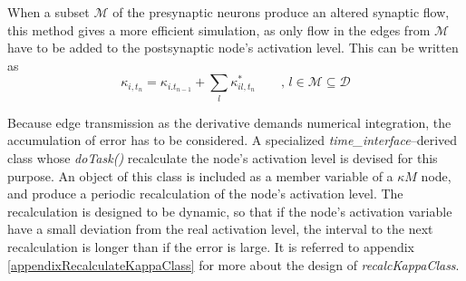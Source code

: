 		When a subset $\mathcal{M}$ of the presynaptic neurons produce an altered synaptic flow, this method gives a more efficient simulation,
			as only flow in the edges from $\mathcal{M}$ have to be added to the postsynaptic node's activation level.
		This can be written as
\begin{equation}
	\kappa_{i, t_n} = \kappa_{i. t_{n-1}} + \sum_l \kappa_{il, t_n}^* \qquad,\, l\in \mathcal{M} \subseteq \mathcal{D}
\end{equation}

		Because edge transmission as the derivative demands numerical integration, the accumulation of error has to be considered.
		A specialized \emph{time\_interface}--derived class whose \emph{doTask()} recalculate the node's activation level is devised for this purpose.
		An object of this class is included as a member variable of a $\kappa M$ node, and produce a periodic recalculation of the node's activation level.
		The recalculation is designed to be dynamic, so that if the node's activation variable have a small deviation from the real activation level, the interval to the next recalculation is longer than if the error is large.
		It is referred to appendix \ref{appendixRecalculateKappaClass} for more about the design of \emph{recalcKappaClass}.
		
